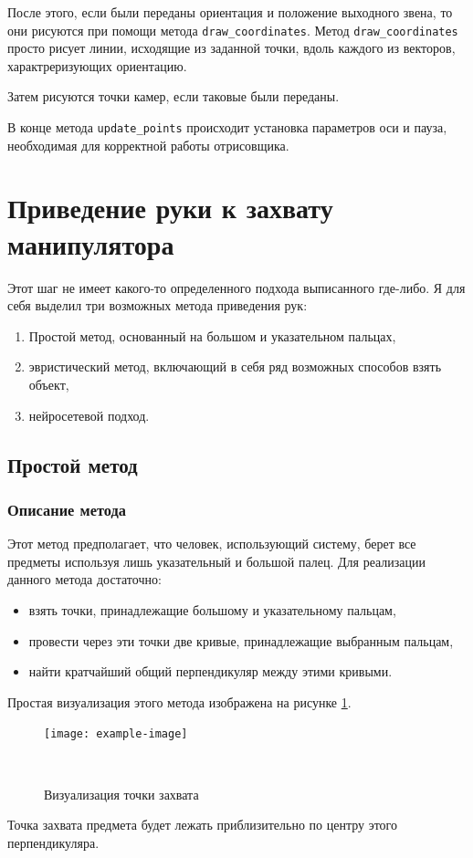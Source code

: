 \documentclass[12pt, a4paper]{article}
\begin{document}
После этого, если были переданы ориентация и положение выходного звена, то они
рисуются при помощи метода \texttt{draw\_coordinates}.
Метод \texttt{draw\_coordinates} просто рисует линии, исходящие из заданной
точки, вдоль каждого из векторов, характреризующих ориентацию.

Затем рисуются точки камер, если таковые были переданы.

В конце метода \texttt{update\_points} происходит установка параметров оси и
пауза, необходимая для корректной работы отрисовщика.


\section{Приведение руки к захвату манипулятора}
Этот шаг не имеет какого-то определенного подхода выписанного где-либо. Я для
себя выделил три возможных метода приведения рук:
\begin{enumerate}
    \item Простой метод, основанный на большом и указательном пальцах,
    \item эвристический метод, включающий в себя ряд возможных способов взять
      объект,
    \item нейросетевой подход.
\end{enumerate}

\subsection{Простой метод}
\label{sec:gripper_basic_method}
\subsubsection{Описание метода}
Этот метод предполагает, что человек, использующий систему, берет все предметы
используя лишь указательный и большой палец. Для реализации данного метода
достаточно:
\begin{itemize}
    \item взять точки, принадлежащие большому и указательному пальцам,
    \item провести через эти точки две кривые, принадлежащие выбранным пальцам,
    \item найти кратчайший общий перпендикуляр между этими кривыми.
\end{itemize}
Простая визуализация этого метода изображена на рисунке \ref{fig:basic_gripping_simple_model}.
\begin{figure}[h!]
    \centering
    \texttt{[image: example-image]}
    \caption{Визуализация точки захвата}
~\label{fig:basic_gripping_simple_model}
\end{figure}
Точка захвата предмета будет лежать приблизительно по центру этого перпендикуляра.
\end{document}
